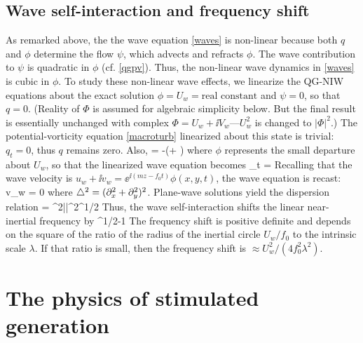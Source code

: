 \documentclass{jfm}
\begin{document}
\subsection{Wave self-interaction and frequency shift}
As remarked above, the the wave equation \eqref{waves} is non-linear because both $q$ and $\phi$
determine the flow $\psi$, which advects and refracts $\phi$. The wave contribution
to $\psi$ is quadratic in $\phi$ (cf. \eqref{qgpv}). Thus, the non-linear wave
dynamics in   \eqref{waves} is cubic in $\phi$.
To study these non-linear wave effects, we linearize the QG-NIW equations  about
 the exact solution
$\phi = U_w = \text{real constant}$ and $\psi = 0$, so that $q=0$. (Reality of
$\Phi$ is assumed for algebraic simplicity below. But the final result is
essentially unchanged
with complex $\Phi = U_w + \ii V_w$---$U_w^2$ is changed to $|\Phi|^2$.) The potential-vorticity
equation \eqref{macroturb} linearized about this state is trivial: $q_t = 0$,
 thus $q$ remains zero. Also,
\beq
\label{lin_q}
 \lap \psi = -\lap\half(\phi + \phis)\com
\eeq
where $\phi$ represents the small departure about $U_w$, so that
the linearized wave equation becomes
\beq
\phi_t =  \per
\eeq
Recalling that the wave velocity is $u_w + \ii v_w = \ee^{\ii (mz -f_0 t)}\phi(x,y,t)$,
the wave equation is recast:
\beq
{} v_w = 0\com
\eeq
where $\triangle^2 = (\partial_x^2 + \partial_y^2)^2$. Plane-wave solutions yield the
dispersion relation
\beq
{} = \half \lambda^2|\kb|^2^{1/2}\per
\eeq
 Thus, the wave self-interaction shifts the linear near-inertial frequency by
\beq
{}^{1/2}-1\per
\eeq
The frequency shift is positive definite and depends on the square of the ratio
of the radius of the inertial circle $U_w/f_0$ to the intrinsic scale $\lambda$.
If that
ratio is small, then the frequency shift is  $\approx  U_w^2/(4 f_0^2\lambda^2)$.

\section{The physics of stimulated generation}\label{physics}
\end{document}
